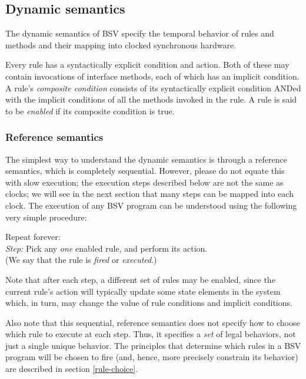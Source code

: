 \documentclass[twoside,letterpaper]{article}
\newcommand{\hmm}{\hspace*{2em}}
\newcommand{\hmmmm}{\hspace*{4em}}
\newcommand{\BSV}{BSV}
\begin{document}

\subsection{Dynamic semantics}

\label{sec-dynamic-semantics}

The dynamic semantics of {\BSV} specify the temporal behavior of rules
and methods and their mapping into clocked synchronous hardware.

Every rule has a syntactically explicit condition and action.  Both of
these may contain invocations of interface methods, each of which has
an implicit condition.  A rule's \emph{composite condition} consists
of its syntactically explicit condition ANDed with the implicit
conditions of all the methods invoked in the rule.  A rule is said to
be \emph{enabled} if its composite condition is true.


\subsubsection{Reference semantics}

\label{sec-reference-semantics}

The simplest way to understand the dynamic semantics is through a
reference semantics, which is completely sequential.  However, please
do not equate this with slow execution; the execution steps described
below are not the same as clocks; we will see in the next section that
many steps can be mapped into each clock.  The execution of any {\BSV}
program can be understood using the following very simple procedure:

\begin{tabbing}
\hmm Repeat forever: \\
\hmmmm \emph{Step:} Pick any \emph{one} enabled rule, and perform its action. \\
\hmmmm (We say that the rule is \emph{fired} or \emph{executed}.)

\end{tabbing}

Note that after each step, a different set of rules may be enabled,
since the current rule's action will typically update some state
elements in the system which, in turn, may change the value of rule
conditions and implicit conditions.

Also note that this sequential, reference semantics does not specify 
how to choose which rule to execute at each step. Thus, it specifies 
a \emph{set} of legal behaviors, not just a single unique 
behavior. The principles that determine which rules in a {\BSV} program 
will be chosen to fire (and, hence, more precisely constrain its behavior) 
are described in section \ref{rule-choice}.
\end{document}
